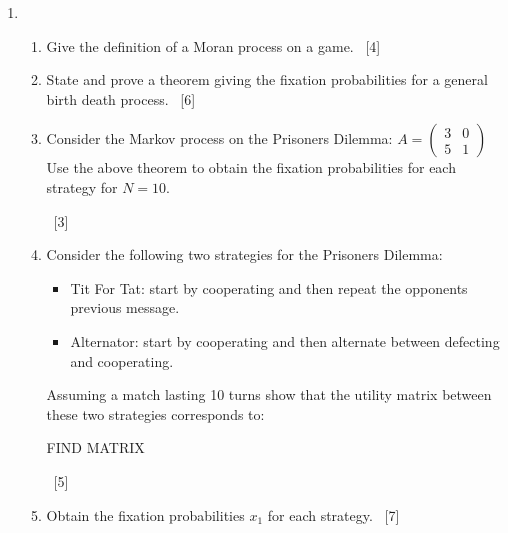 \documentclass[12pt,a4paper]{article}
\makeatletter
\renewcommand{\@oddfoot}{\hfil \arabic{page} \hfil}    %
\makeatother
\begin{document}
\begin{enumerate}
\newpage
\item

    \begin{enumerate}
        \item Give the definition of a Moran process on a game.
            ~\hfill{[4]}
        \item State and prove a theorem giving the fixation probabilities for a
            general birth death process.
            ~\hfill{[6]}
        \item Consider the Markov process on the Prisoners Dilemma:
        \(A = \begin{pmatrix} 3 & 0\\ 5 & 1 \end{pmatrix}\)
            Use the above theorem to obtain the fixation probabilities for each
            strategy for \(N=10\).

            ~\hfill{[3]}
        \item Consider the following two strategies for the Prisoners Dilemma:
            \begin{itemize}
                \item Tit For Tat: start by cooperating and then repeat the
                    opponents previous message.
                \item Alternator: start by cooperating and then alternate
                    between defecting and cooperating.
            \end{itemize}
            Assuming a match lasting 10 turns show that the utility matrix
            between these two strategies corresponds to:

            \begin{center}
                FIND MATRIX
            \end{center}
                ~\hfill{[5]}
      \item Obtain the fixation probabilities \(x_1\) for each strategy.
          ~\hfill{[7]}
    \end{enumerate}
\end{enumerate}


\makeatletter
\renewcommand{\@oddfoot}{\hfil \arabic{page}X \hfil}    %
\makeatother
\end{document}
